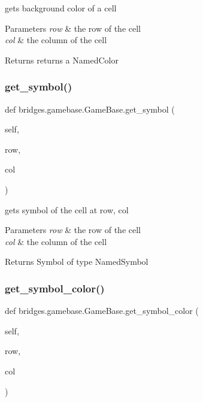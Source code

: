 gets background color of a cell 


\begin{DoxyParams}{Parameters}
{\em row} & the row of the cell \\
\hline
{\em col} & the column of the cell\\
\hline
\end{DoxyParams}
\begin{DoxyReturn}{Returns}
returns a Named\+Color 
\end{DoxyReturn}
\mbox{\label{classbridges_1_1gamebase_1_1_game_base_a80a3f5e32f8d0ad45c3f72d3c3e134e3}} 
\subsubsection{\texorpdfstring{get\_symbol()}{get\_symbol()}}
{\footnotesize\ttfamily def bridges.\+gamebase.\+Game\+Base.\+get\+\_\+symbol (\begin{DoxyParamCaption}\item[{}]{self,  }\item[{}]{row,  }\item[{}]{col }\end{DoxyParamCaption})}



gets symbol of the cell at row, col 


\begin{DoxyParams}{Parameters}
{\em row} & the row of the cell \\
\hline
{\em col} & the column of the cell\\
\hline
\end{DoxyParams}
\begin{DoxyReturn}{Returns}
Symbol of type Named\+Symbol 
\end{DoxyReturn}
\mbox{\label{classbridges_1_1gamebase_1_1_game_base_a7cb6637713536701e89e870a5a3428a1}} 
\subsubsection{\texorpdfstring{get\_symbol\_color()}{get\_symbol\_color()}}
{\footnotesize\ttfamily def bridges.\+gamebase.\+Game\+Base.\+get\+\_\+symbol\+\_\+color (\begin{DoxyParamCaption}\item[{}]{self,  }\item[{}]{row,  }\item[{}]{col }\end{DoxyParamCaption})}



